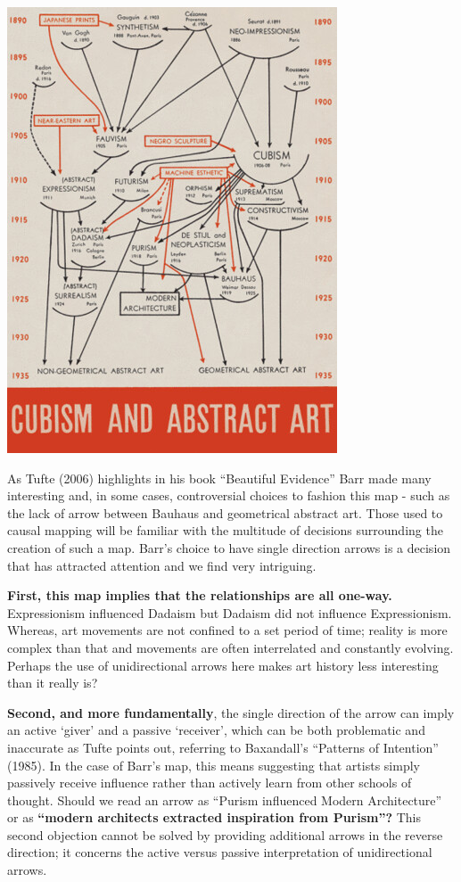 \documentclass[
]{book}
\begin{document}
\includegraphics{_assets/TufteOG-16335945994571.jpg}

As Tufte (2006) highlights in his book ``Beautiful Evidence'' Barr made many interesting and, in some cases, controversial choices to fashion this map - such as the lack of arrow between Bauhaus and geometrical abstract art. Those used to causal mapping will be familiar with the multitude of decisions surrounding the creation of such a map. Barr's choice to have single direction arrows is a decision that has attracted attention and we find very intriguing.

\textbf{First, this map implies that the relationships are all one-way.} Expressionism influenced Dadaism but Dadaism did not influence Expressionism. Whereas, art movements are not confined to a set period of time; reality is more complex than that and movements are often interrelated and constantly evolving. Perhaps the use of unidirectional arrows here makes art history less interesting than it really is?

\textbf{Second, and more fundamentally}, the single direction of the arrow can imply an active `giver' and a passive `receiver', which can be both problematic and inaccurate as Tufte points out, referring to Baxandall's ``Patterns of Intention'' (1985). In the case of Barr's map, this means suggesting that artists simply passively receive influence rather than actively learn from other schools of thought. Should we read an arrow as ``Purism influenced Modern Architecture'' or as \textbf{``modern architects extracted inspiration from Purism''?} This second objection cannot be solved by providing additional arrows in the reverse direction; it concerns the active versus passive interpretation of unidirectional arrows.
\end{document}
